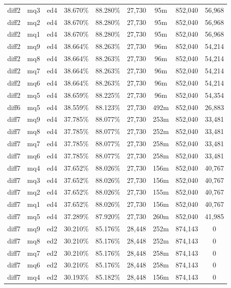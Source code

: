 \begin{landscape}
\begin{longtable}{|c|c|c||c|c||c|c|c|c|}
diff2 & mq3 & ed4 & 38.670\% & 88.280\% & 27,730 & 95m & 852,040 & 56,968 \\
diff2 & mq2 & ed4 & 38.670\% & 88.280\% & 27,730 & 95m & 852,040 & 56,968 \\
diff2 & mq1 & ed4 & 38.670\% & 88.280\% & 27,730 & 95m & 852,040 & 56,968 \\
diff2 & mq9 & ed4 & 38.664\% & 88.263\% & 27,730 & 96m & 852,040 & 54,214 \\
diff2 & mq8 & ed4 & 38.664\% & 88.263\% & 27,730 & 96m & 852,040 & 54,214 \\
diff2 & mq7 & ed4 & 38.664\% & 88.263\% & 27,730 & 96m & 852,040 & 54,214 \\
diff2 & mq6 & ed4 & 38.664\% & 88.263\% & 27,730 & 96m & 852,040 & 54,214 \\
diff2 & mq5 & ed4 & 38.659\% & 88.225\% & 27,730 & 96m & 852,040 & 54,354 \\
diff6 & mq5 & ed4 & 38.559\% & 88.123\% & 27,730 & 492m & 852,040 & 26,883 \\
diff7 & mq9 & ed4 & 37.785\% & 88.077\% & 27,730 & 253m & 852,040 & 33,481 \\
diff7 & mq8 & ed4 & 37.785\% & 88.077\% & 27,730 & 252m & 852,040 & 33,481 \\
diff7 & mq7 & ed4 & 37.785\% & 88.077\% & 27,730 & 258m & 852,040 & 33,481 \\
diff7 & mq6 & ed4 & 37.785\% & 88.077\% & 27,730 & 258m & 852,040 & 33,481 \\
diff7 & mq4 & ed4 & 37.652\% & 88.026\% & 27,730 & 156m & 852,040 & 40,767 \\
diff7 & mq3 & ed4 & 37.652\% & 88.026\% & 27,730 & 156m & 852,040 & 40,767 \\
diff7 & mq2 & ed4 & 37.652\% & 88.026\% & 27,730 & 155m & 852,040 & 40,767 \\
diff7 & mq1 & ed4 & 37.652\% & 88.026\% & 27,730 & 156m & 852,040 & 40,767 \\
diff7 & mq5 & ed4 & 37.289\% & 87.920\% & 27,730 & 260m & 852,040 & 41,985 \\
diff7 & mq9 & ed2 & 30.210\% & 85.176\% & 28,448 & 252m & 874,143 & 0 \\
diff7 & mq8 & ed2 & 30.210\% & 85.176\% & 28,448 & 252m & 874,143 & 0 \\
diff7 & mq7 & ed2 & 30.210\% & 85.176\% & 28,448 & 258m & 874,143 & 0 \\
diff7 & mq6 & ed2 & 30.210\% & 85.176\% & 28,448 & 258m & 874,143 & 0 \\
diff7 & mq4 & ed2 & 30.193\% & 85.182\% & 28,448 & 156m & 874,143 & 0 \\

\end{longtable}
\end{landscape}
